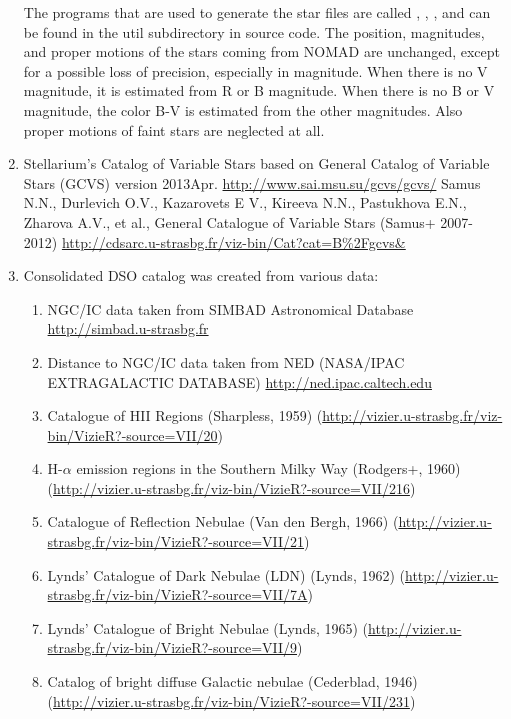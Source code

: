 \begin{enumerate}
\begin{itemize}
	\end{itemize}
    The programs that are used to generate the star files are called
    , , , and can be
    found in the util subdirectory in source code. The position,
    magnitudes, and proper motions of the stars coming from NOMAD
    are unchanged, except for a possible loss of precision,
    especially in magnitude. When there is no V magnitude, it is
    estimated from R or B magnitude.  When there is no B or V
    magnitude, the color B-V is estimated from the other magnitudes.
    Also proper motions of faint stars are neglected at all.
\item Stellarium's Catalog of Variable Stars based on General Catalog of Variable Stars (GCVS) version 2013Apr. \url{http://www.sai.msu.su/gcvs/gcvs/}
    Samus N.N., Durlevich O.V., Kazarovets E V., Kireeva N.N., Pastukhova E.N., Zharova A.V., et al., General Catalogue of Variable Stars (Samus+ 2007-2012)
    \url{http://cdsarc.u-strasbg.fr/viz-bin/Cat?cat=B%2Fgcvs&}
\item Consolidated DSO catalog was created from various data:
	\begin{enumerate}
     \item NGC/IC data taken from SIMBAD Astronomical Database \url{http://simbad.u-strasbg.fr}
     \item Distance to NGC/IC data taken from NED                (NASA/IPAC EXTRAGALACTIC DATABASE)  \url{http://ned.ipac.caltech.edu}
     \item Catalogue of HII Regions                              (Sharpless, 1959)     (\url{http://vizier.u-strasbg.fr/viz-bin/VizieR?-source=VII/20})
     \item H-$\alpha$ emission regions in the Southern Milky Way (Rodgers+, 1960)      (\url{http://vizier.u-strasbg.fr/viz-bin/VizieR?-source=VII/216})
     \item Catalogue of Reflection Nebulae                       (Van den Bergh, 1966) (\url{http://vizier.u-strasbg.fr/viz-bin/VizieR?-source=VII/21})
     \item Lynds' Catalogue of Dark Nebulae (LDN)                (Lynds, 1962)         (\url{http://vizier.u-strasbg.fr/viz-bin/VizieR?-source=VII/7A})
     \item Lynds' Catalogue of Bright Nebulae                    (Lynds, 1965)         (\url{http://vizier.u-strasbg.fr/viz-bin/VizieR?-source=VII/9})
     \item Catalog of bright diffuse Galactic nebulae            (Cederblad, 1946)     (\url{http://vizier.u-strasbg.fr/viz-bin/VizieR?-source=VII/231})

\end{enumerate}
\end{enumerate}

